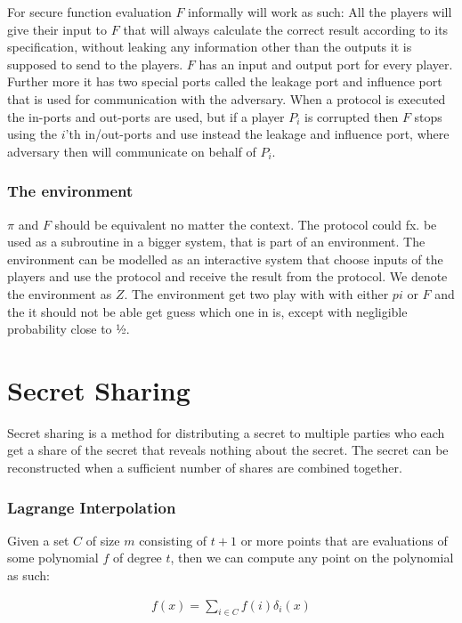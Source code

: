 For secure function evaluation $F$ informally will work as such: All the players will give their input to $F$ that will always calculate the correct result according to its specification, without leaking any information other than the outputs it is supposed to send to the players. $F$ has an input and output port for every player. Further more it has two special ports called the leakage port and influence port that is used for communication with the adversary. When a protocol is executed the in-ports and out-ports are used, but if a player $P_i$ is corrupted then $F$ stops using the $i$'th in/out-ports and use instead the leakage and influence port, where adversary then will communicate on behalf of $P_i$.

\subsubsection{The environment}
$\pi$ and $F$ should be equivalent no matter the context. The protocol could fx. be used as a subroutine in a bigger system, that is  part of an environment. The environment can be modelled as an interactive system that choose inputs of the players and use the protocol and receive the result from the protocol. We denote the environment as $Z$. The environment get two play with with either $pi$ or $F$ and the it should not be able get guess which one in is, except with negligible probability close to ½.

\section{Secret Sharing}
Secret sharing is a method for distributing a secret to multiple parties who each get a share of the secret that reveals nothing about the secret. The secret can be reconstructed when a sufficient number of shares are combined together.

\subsubsection{Lagrange Interpolation}
Given a set $C$ of size $m$ consisting of $t+1$ or more points that are evaluations of some polynomial $f$ of degree $t$, then we can compute any point on the polynomial as such:

\begin{align*}
    f(x) = \sum_{i \in C} f(i) \delta_i(x) 
\end{align*}

